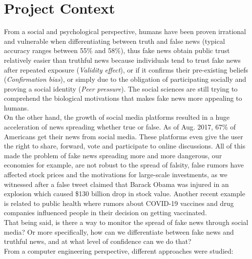 \documentclass[10pt, english]{report}
\begin{document}
\section{Project Context}

From a social and psychological perspective, humans have been proven irrational and vulnerable when differentiating between truth and false news (typical accuracy ranges between 55\% and 58\%), thus fake news obtain public trust relatively easier than truthful news because individuals tend to trust fake news after repeated exposure (\textit{Validity effect}), or if it confirms their pre-existing beliefs (\textit{Confirmation bias}), or simply due to the obligation of participating socially and proving a social identity (\textit{Peer pressure}). The social sciences are still trying to comprehend the biological motivations that makes fake news more appealing to humans.\\

On the other hand, the growth of social media platforms resulted in a huge acceleration of news spreading whether true or false. As of Aug. 2017, 67\% of Americans get their news from social media. These platforms even give the user the right to share, forward, vote and participate to online discussions. All of this made the problem of fake news spreading more and more dangerous, our economies for example, are not robust to the spread of falsity, false rumors have affected stock prices and the motivations for large-scale investments, as we witnessed after a false tweet claimed that Barack Obama was injured in an explosion which caused \$130 billion drop in stock value. Another recent example is related to public health where rumors about COVID-19 vaccines and drug companies influenced people in their decision on getting vaccinated.\\

That being said, is there a way to monitor the spread of fake news through social media? Or more specifically, how can we differentiate between fake news and truthful news, and at what level of confidence can we do that?\\

From a computer engineering perspective, different approaches were studied:
\end{document}
